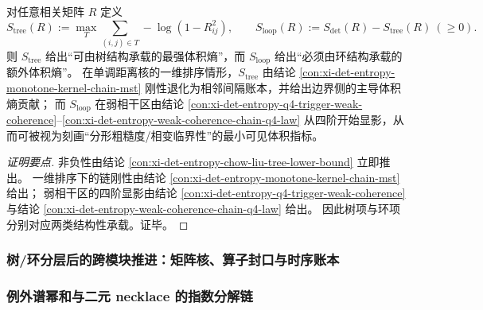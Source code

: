 \begin{conclusion}\label{con:xi-det-entropy-tree-loop-stratification}
对任意相关矩阵 \(R\) 定义
\[
S_{\mathrm{tree}}(R):=\max_{T}\sum_{(i,j)\in T}-\log(1-R_{ij}^2),
\qquad
S_{\mathrm{loop}}(R):=S_{\det}(R)-S_{\mathrm{tree}}(R)\ (\ge0).
\]
则 \(S_{\mathrm{tree}}\) 给出“可由树结构承载的最强体积熵”，而 \(S_{\mathrm{loop}}\) 给出“必须由环结构承载的额外体积熵”。
在单调距离核的一维排序情形，\(S_{\mathrm{tree}}\) 由结论 \ref{con:xi-det-entropy-monotone-kernel-chain-mst} 刚性退化为相邻间隔账本，并给出边界侧的主导体积熵贡献；
而 \(S_{\mathrm{loop}}\) 在弱相干区由结论 \ref{con:xi-det-entropy-q4-trigger-weak-coherence}--\ref{con:xi-det-entropy-weak-coherence-chain-q4-law} 从四阶开始显影，从而可被视为刻画“分形粗糙度/相变临界性”的最小可见体积指标。
\end{conclusion}
\begin{proof}[证明要点]
非负性由结论 \ref{con:xi-det-entropy-chow-liu-tree-lower-bound} 立即推出。
一维排序下的链刚性由结论 \ref{con:xi-det-entropy-monotone-kernel-chain-mst} 给出；
弱相干区的四阶显影由结论 \ref{con:xi-det-entropy-q4-trigger-weak-coherence} 与结论 \ref{con:xi-det-entropy-weak-coherence-chain-q4-law} 给出。
因此树项与环项分别对应两类结构性承载。证毕。
\end{proof}

\subsubsection{树/环分层后的跨模块推进：矩阵核、算子封口与时序账本}\label{subsubsec:xi-det-entropy-cross-module-propagation}











\subsubsection{例外谱幂和与二元 necklace 的指数分解链}\label{subsubsec:xi-exceptional-spectrum-necklace-chain}




